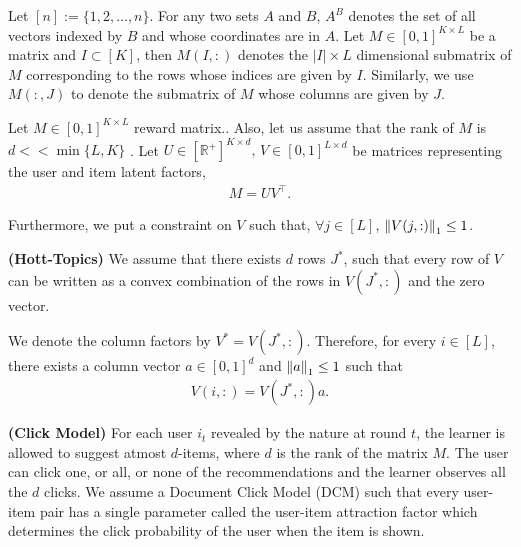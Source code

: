 Let $[n] := \lbrace 1,2,\ldots, n\rbrace$. For any two sets $A$ and $B$, $A^B$ denotes the set of all vectors indexed by $B$ and whose coordinates are in $A$. Let $M\in [0,1]^{K\times L}$ be a matrix and $I \subset [K] $, then $M(I,:)$ denotes the $|I| \times L$ dimensional submatrix of $M$ corresponding to the rows whose indices are given by $I$. Similarly, we use $M(:,J)$ to denote the submatrix of $M$ whose columns are given by $J$.
	
	Let $M \in  [0,1]^{K \times L}$  reward matrix.. Also, let us assume that the rank of  $M$ is $d << \min\lbrace L,K\rbrace$ . Let $ U \in [ \mathbb{R}^+ ]^{K\times d} \textbf{, } V \in  [0,1]^{L\times d}$ be matrices representing the user and item latent factors, 
\begin{align*}
	M = UV^{\intercal} .
\end{align*}	  
	
	Furthermore, we put a constraint on $V$ such that, $\forall j\in [L]$, $ \left\lVert V(j,:)\right\rVert_1 \leq 1$. 
	
	
\begin{assumption}\textbf{(Hott-Topics)}
\label{assm:hott-topics}
We assume that there exists $d$ rows $J^*$,  such that every row of $V$ can be written as a convex combination of the rows in $V(J^*,:)$ and the zero vector. \end{assumption}
We denote the column  factors by $V^* = V(J^*,:)$. Therefore, for every $i\in [L]$, there exists a column vector $a \in [0,1]^{d}$ and $ \left\lVert a\right\rVert_1 \leq 1$ such that 
\begin{align*}
V(i,:) = V(J^*,:) a.
\end{align*}




\begin{assumption}\textbf{(Click Model)}
\label{assm:click-model}
For each user $i_t$ revealed by the nature at round $t$, the learner is allowed to suggest atmost $d$-items, where $d$ is the rank of the matrix $M$. The user can click one, or all, or none of the recommendations and the learner observes all the $d$ clicks. We assume a Document Click Model (DCM) such that every user-item pair has a single parameter called the user-item attraction factor which determines the click probability of the user when the item is shown.  
\end{assumption}

